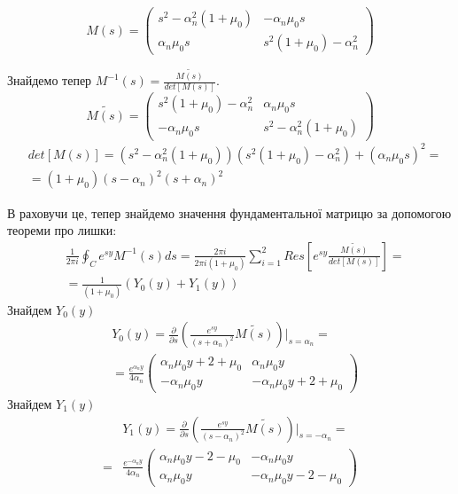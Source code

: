\documentclass[a4paper,14pt]{extarticle}
\numberwithin{equation}{section}
\begin{document}
\begin{equation}
    M(s) = \begin{pmatrix}
        s^2 -\alpha_n^2(1 + \mu_0) & -\alpha_n \mu_0 s \\
        \alpha_n \mu_0 s & s^2 (1 + \mu_0) -\alpha_n^2
     \end{pmatrix}
\end{equation}

Знайдемо тепер $M^{-1}(s) = \frac{\widetilde{M(s)}}{det[M(s)]}$.
\begin{equation}
    \widetilde{M(s)} = \begin{pmatrix}
        s^2 (1 + \mu_0) -\alpha_n^2 & \alpha_n \mu_0 s \\
        -\alpha_n \mu_0 s & s^2 -\alpha_n^2(1 + \mu_0)
     \end{pmatrix}
\end{equation}
\begin{align}
    &det[M(s)] = (s^2 -\alpha_n^2(1 + \mu_0))(s^2 (1 + \mu_0) -\alpha_n^2) + (\alpha_n \mu_0 s)^2 = \nonumber \\
    &=(1+\mu_0)(s - \alpha_n)^2(s + \alpha_n)^2
\end{align}

В раховучи це, тепер знайдемо значення фундаментальної матрицю за допомогою теореми про лишки:
\begin{align*}
    &\frac{1}{2\pi i} \oint_C e^{sy} M^{-1}(s)ds = \frac{2 \pi i}{2 \pi i (1 + \mu_0)} \sum_{i=1}^{2} Res\left[ e^{sy} \frac{\widetilde{M(s)}}{det[M(s)]} \right] = \\
    & = \frac{1}{(1 + \mu_0)} \left(Y_0(y) + Y_1(y) \right)
\end{align*}
Знайдем $Y_0(y)$
\begin{align}
    &Y_0(y) =  \frac{\partial}{\partial s} \left( \frac{e^{sy}}{(s+\alpha_n)^2} \widetilde{M(s)} \right) \Big|_{s=\alpha_n} = \nonumber \\
    &=\frac{e^{\alpha_n y}}{4\alpha_n} \begin{pmatrix}
    \alpha_n \mu_0 y + 2 + \mu_0 & \alpha_n \mu_0 y \\
    -\alpha_n \mu_0 y & -\alpha_n \mu_0 y + 2 + \mu_0
    \end{pmatrix}
\end{align}
Знайдем $Y_1(y)$
\begin{align}
    &Y_1(y) = \frac{\partial}{\partial s} \left(\frac{e^{sy}}{(s-\alpha_n)^2} \widetilde{M(s)} \right) \Big|_{s=-\alpha_n} = \nonumber \\
    =&\frac{e^{-\alpha_n y}}{4\alpha_n} \begin{pmatrix}
    \alpha_n \mu_0 y - 2 - \mu_0 & -\alpha_n \mu_0 y \\
    \alpha_n \mu_0 y & -\alpha_n \mu_0 y - 2 - \mu_0
    \end{pmatrix}
\end{align}
\end{document}
